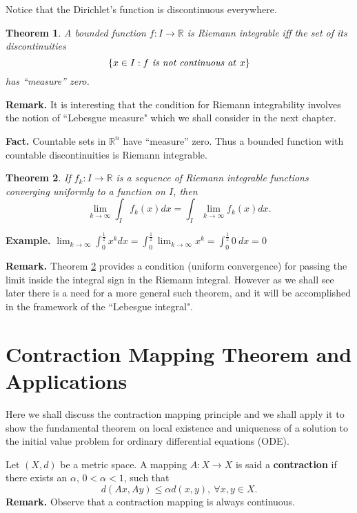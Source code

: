 \documentclass[12pt]{report}
\newtheorem{theorem}{Theorem}[section]
\begin{document}
\medskip Notice that the Dirichlet's function is discontinuous
everywhere.

\begin{theorem}
\label{th:almost-cont-int}  A bounded function $ f: I
\longrightarrow
\mathbb{R}$ is Riemann integrable iff the set of its discontinuities
\[
\{x \in I: f \mbox{\textit{ is not continuous at }} x \}
\]
has ``measure'' zero.
\end{theorem}

\medskip
\noindent
\textbf{Remark.} It is interesting that the condition for 
Riemann integrability involves the notion of ``Lebesgue measure"
which we shall consider in the next chapter.

\medskip
\noindent
\textbf{Fact.}  Countable sets in $\mathbb{R}^n$ have ``measure''
zero.  Thus a bounded function with countable discontinuities is
Riemann integrable.

\begin{theorem}
\label{th:unif-cont-int} If $f_k: I \longrightarrow \mathbb{R}$ is a
sequence of Riemann integrable functions converging uniformly to a
function on $I$, then
\[
\lim_{k \to \infty} \int_I f_k(x) dx = \int_I \lim_{k \to \infty} f_k (x)
dx.
\]
\end{theorem}
 \medskip
\noindent
\textbf{Example.}  $\displaystyle{\lim_{k \to \infty}
\int^{\frac{1}{2}}_0 x^k dx =
\int^{\frac{1}{2}}_0 \lim_{k \to \infty} x^k = \int^{\frac{1}{2}}_0 0 \
dx = 0}$

\medskip
\noindent
{\bf Remark.} Theorem \ref{th:unif-cont-int} provides a condition
(uniform convergence) for passing the limit inside the integral
sign in the Riemann integral. However as we shall see later
there is a need for a more general such theorem, and it will be
accomplished in the framework of the ``Lebesgue integral".



\section{Contraction Mapping Theorem and
Applications}
Here we shall discuss the contraction  mapping principle and we shall
apply it to show  the fundamental theorem on local existence and
uniqueness of a solution to the initial value problem for  ordinary
differential equations (ODE).

\medskip
\noindent
Let $(X, d)$ be a  metric space.  A mapping $A:X \to X$ is said
a {\bf contraction} if there exists an  $\alpha$, $0 < \alpha < 1$, such
that
\[
d(Ax, Ay) \le \alpha d(x, y), \ \forall x, y \in X.
\]
{\bf Remark.} Observe that a contraction mapping is always
continuous.
\end{document}
